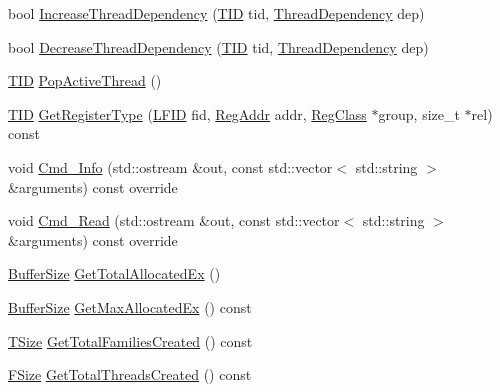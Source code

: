 \begin{DoxyCompactItemize}
\item 
bool \hyperlink{class_simulator_1_1drisc_1_1_allocator_a18e3a82c42a484f1ec1369152c2ee544}{Increase\+Thread\+Dependency} (\hyperlink{namespace_simulator_a483cc4ecee1736e895054617672cded5}{T\+I\+D} tid, \hyperlink{namespace_simulator_1_1drisc_ad6854da07c57895c7a56c85e725e9efa}{Thread\+Dependency} dep)
\item 
bool \hyperlink{class_simulator_1_1drisc_1_1_allocator_ab903d41c70f31adb730e8919da05a6cb}{Decrease\+Thread\+Dependency} (\hyperlink{namespace_simulator_a483cc4ecee1736e895054617672cded5}{T\+I\+D} tid, \hyperlink{namespace_simulator_1_1drisc_ad6854da07c57895c7a56c85e725e9efa}{Thread\+Dependency} dep)
\item 
\hyperlink{namespace_simulator_a483cc4ecee1736e895054617672cded5}{T\+I\+D} \hyperlink{class_simulator_1_1drisc_1_1_allocator_a889c7746b9b885ac9e37596ca3ccac7a}{Pop\+Active\+Thread} ()
\item 
\hyperlink{namespace_simulator_a483cc4ecee1736e895054617672cded5}{T\+I\+D} \hyperlink{class_simulator_1_1drisc_1_1_allocator_a0fed73adf3ee355ed1823e5e0a472845}{Get\+Register\+Type} (\hyperlink{namespace_simulator_aaccbc706b2d6c99085f52f6dfc2333e4}{L\+F\+I\+D} fid, \hyperlink{struct_simulator_1_1_reg_addr}{Reg\+Addr} addr, \hyperlink{namespace_simulator_aed8a64878dc9a85785a9289468470a77}{Reg\+Class} $\ast$group, size\+\_\+t $\ast$rel) const 
\item 
void \hyperlink{class_simulator_1_1drisc_1_1_allocator_ace8d867aff390825ad217a9fcf660d39}{Cmd\+\_\+\+Info} (std\+::ostream \&out, const std\+::vector$<$ std\+::string $>$ \&arguments) const override
\item 
void \hyperlink{class_simulator_1_1drisc_1_1_allocator_a9fa7bf5e89129ea06eafb37091bb69d9}{Cmd\+\_\+\+Read} (std\+::ostream \&out, const std\+::vector$<$ std\+::string $>$ \&arguments) const override
\item 
\hyperlink{namespace_simulator_a5ca279f926485be2d0554e41275a3305}{Buffer\+Size} \hyperlink{class_simulator_1_1drisc_1_1_allocator_aea916d0822bbf0f1918111da2673bc5b}{Get\+Total\+Allocated\+Ex} ()
\item 
\hyperlink{namespace_simulator_a5ca279f926485be2d0554e41275a3305}{Buffer\+Size} \hyperlink{class_simulator_1_1drisc_1_1_allocator_abbd9728a4d18602c6ea8d0581e4504b6}{Get\+Max\+Allocated\+Ex} () const 
\item 
\hyperlink{namespace_simulator_aefe00209f3ea9f8e24874de522c3c3e7}{T\+Size} \hyperlink{class_simulator_1_1drisc_1_1_allocator_a9e896968e323c2447d6778c8d8e513b8}{Get\+Total\+Families\+Created} () const 
\item 
\hyperlink{namespace_simulator_a06544009313d7c13d411b1c074e5acff}{F\+Size} \hyperlink{class_simulator_1_1drisc_1_1_allocator_add227dd1e85ff6106f98e68b564a9131}{Get\+Total\+Threads\+Created} () const 
\end{DoxyCompactItemize}
